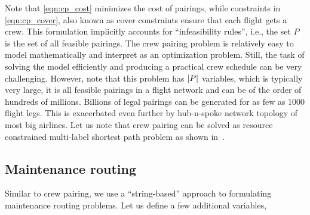 \documentclass[letterpaper, 10pt, twocolumn, reqno]{amsart}
\begin{document}
Note that \eqref{eqn:cp_cost} minimizes the cost of pairings, while constraints in \eqref{eqn:cp_cover}, also known as cover constraints ensure that each flight gets a crew. This formulation implicitly accounts for ``infeasibility rules'', i.e., the set $P$ is the set of all feasible pairings.
The crew pairing problem is relatively easy to
model mathematically and interpret as an optimization problem. Still, the task of solving the model efficiently and producing a practical crew schedule can be very challenging. However, note that this problem has $\left| P \right|$ variables, which is typically very large, it is all feasible pairings in a flight network and can be of the order of hundreds of millions. Billions of legal pairings can be generated for as few as 1000 flight legs. This is exacerbated even further by hub-n-spoke network topology of most big airlines. Let us note that crew pairing can be solved as resource constrained multi-label shortest path problem as shown in~\cite{gopalakrishnan2005airline}.



\subsection{Maintenance routing}
\label{ssec:maintenance_routing}

Similar to crew pairing, we use a ``string-based'' approach to formulating maintenance routing problems. Let us define a few additional variables,
\end{document}
